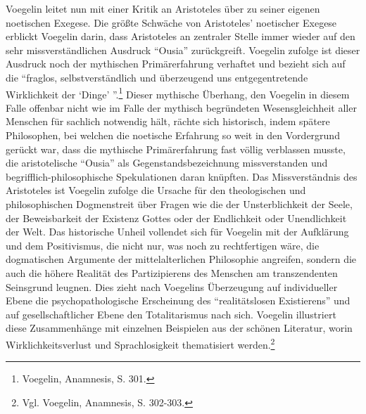 Voegelin leitet nun mit einer Kritik an Aristoteles über zu seiner eigenen
noetischen Exegese. Die größte Schwäche von Aristoteles' noetischer Exegese
erblickt Voegelin darin, dass Aristoteles an zentraler Stelle immer wieder auf
den sehr missverständlichen Ausdruck "`Ousia"' zurückgreift. Voegelin zufolge
ist dieser Ausdruck noch der mythischen Primärerfahrung verhaftet und bezieht
sich auf die "`fraglos, selbstverständlich und überzeugend uns
entgegentretende Wirklichkeit der `Dinge' "'.\footnote{Voegelin, Anamnesis,
  S. 301.} Dieser mythische Überhang, den Voegelin in diesem Falle offenbar
nicht wie im Falle der mythisch begründeten Wesensgleichheit aller Menschen
für sachlich notwendig hält, rächte sich historisch, indem spätere
Philosophen, bei welchen die noetische Erfahrung so weit in den Vordergrund
gerückt war, dass die mythische Primärerfahrung fast völlig verblassen musste,
die aristotelische "`Ousia"' als Gegenstandsbezeichnung missverstanden und
begrifflich-philosophische Spekulationen daran knüpften. Das Missverständnis
des Aristoteles ist Voegelin zufolge die Ursache für den theologischen und
philosophischen Dogmenstreit über Fragen wie die der Unsterblichkeit der
Seele, der Beweisbarkeit der Existenz Gottes oder der Endlichkeit oder
Unendlichkeit der Welt. Das historische Unheil vollendet sich für Voegelin mit
der Aufklärung und dem Positivismus, die nicht nur, was noch zu rechtfertigen
wäre, die dogmatischen Argumente der mittelalterlichen Philosophie angreifen,
sondern die auch die höhere Realität des Partizipierens des Menschen am
transzendenten Seinsgrund leugnen. Dies zieht nach Voegelins Überzeugung auf
individueller Ebene die psychopathologische Erscheinung des "`realitätslosen
Existierens"' und auf gesellschaftlicher Ebene den Totalitarismus nach sich.
Voegelin illustriert diese Zusammenhänge mit einzelnen Beispielen aus der
schönen Literatur, worin Wirklichkeitsverlust und Sprachlosigkeit thematisiert
werden.\footnote{Vgl. Voegelin, Anamnesis, S. 302-303.}

